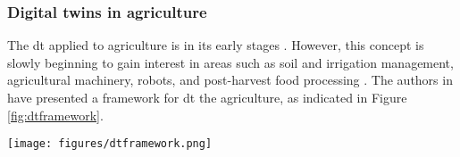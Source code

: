 \documentclass[preprint, review, 12pt]{elsarticle}
\begin{document}

\subsubsection{Digital twins in agriculture}
\label{sec:DTSmartFarming}

The \gls{dt} applied to agriculture is in its early stages \cite{verdouw2021, neethirajan2021}.  However, this concept is slowly beginning to gain interest in areas such as soil and irrigation management, agricultural machinery, robots, and post-harvest food processing \cite{nasirahmadi2022}. The authors in \cite{verdouw2021} have presented a framework for \gls{dt} the agriculture, as indicated in Figure \ref{fig:dtframework}. 

\begin{figure*}
    \centering
    \texttt{[image: figures/dtframework.png]}
    \caption{Integrated control model for \gls{dt} in agriculture as proposed in \cite{verdouw2021}.}
    \label{fig:dtframework}
\end{figure*}
\end{document}
